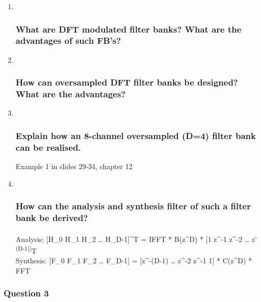 \documentclass[
  a4paper,
  ,captions=tableheading
]{scrartcl}
\begin{document}
\begin{enumerate}
\def\labelenumi{\arabic{enumi}.}
\item ~
  \subsubsection{What are DFT modulated filter banks? What are the
  advantages of such
  FB's?}\label{what-are-dft-modulated-filter-banks-what-are-the-advantages-of-such-fbs-1}
\item ~
  \subsubsection{How can oversampled DFT filter banks be designed? What
  are the
  advantages?}\label{how-can-oversampled-dft-filter-banks-be-designed-what-are-the-advantages}
\item ~
  \subsubsection{Explain how an 8-channel oversampled (D=4) filter bank
  can be
  realised.}\label{explain-how-an-8-channel-oversampled-d4-filter-bank-can-be-realised.}

  Example 1 in slides 29-34, chapter 12
\item ~
  \subsubsection{How can the analysis and synthesis filter of such a
  filter bank be
  derived?}\label{how-can-the-analysis-and-synthesis-filter-of-such-a-filter-bank-be-derived}

  Analysis: {[}H\_0 H\_1 H\_2 \ldots{} H\_D-1{]}\^{}T = IFFT * B(z\^{}D)
  * {[}1 z\^{}-1 z\^{}-2 \ldots{} z\textsuperscript{-(D-1){]}}T\\
  Synthesis: {[}F\_0 F\_1 F\_2 \ldots{} F\_D-1{]} = {[}z\^{}-(D-1)
  \ldots{} z\^{}-2 z\^{}-1 1{]} * C(z\^{}D) * FFT
\end{enumerate}

\subsubsection{Question 3}\label{question-3-7}
\end{document}
